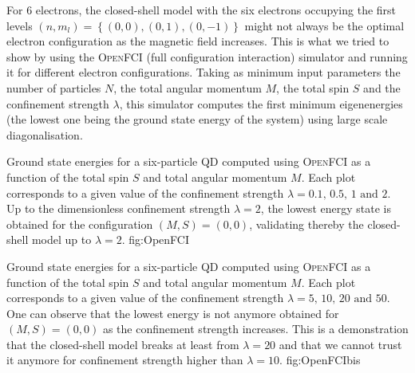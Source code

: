 For 6 electrons, the closed-shell model with the six electrons occupying the first levels $(n,m_l)=\left\{(0,0),(0,1),(0,-1)\right\}$ might not always be the optimal electron configuration as the magnetic field increases.
 This is what we tried to show by using the \textsc{OpenFCI} (full configuration interaction) simulator and running it for different electron configurations. Taking as minimum input parameters the number of particles $N$, the total angular momentum $M$, the total spin $S$ and the confinement strength $\lambda$, this simulator computes the first minimum eigenenergies (the lowest one being the ground state energy of the system) using large scale diagonalisation.
% 

{Ground state energies for a six-particle QD computed using \textsc{OpenFCI} as a function of the total spin $S$ and total angular momentum $M$. Each plot corresponds to a given value of the confinement strength $\lambda=0.1,\,0.5,\,1 \text{ and }2$. Up to the dimensionless confinement strength $\lambda=2$, the lowest energy state is obtained for the configuration $(M,S)=(0,0)$, validating thereby the closed-shell model up to $\lambda=2$.}
{fig:OpenFCI}


{Ground state energies for a six-particle QD computed using \textsc{OpenFCI} as a function of the total spin $S$ and total angular momentum $M$. Each plot corresponds to a given value of the confinement strength $\lambda=5,\,10,\,20 \text{ and }50$. One can observe that the lowest energy is not anymore obtained for $(M,S)=(0,0)$ as the confinement strength increases. This is a demonstration that the closed-shell model breaks at least from $\lambda=20$ and that we cannot trust it anymore for confinement strength higher than $\lambda=10$.}
{fig:OpenFCIbis}


